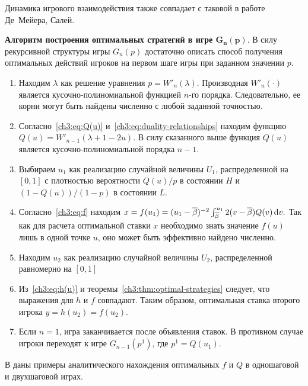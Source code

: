 Динамика игрового взаимодействия также совпадает с таковой в работе Де~Мейера, Салей.

\noindent
\textbf{Алгоритм построения оптимальных стратегий в игре $\mathbf{G_n(p)}$}.
В силу рекурсивной структуры игры $G_n(p)$ достаточно описать способ получения оптимальных действий игроков на первом шаге игры при заданном значении $p$.
\begin{enumerate}
\item
  Находим $\lambda$ как решение уравнения 
  $
    p = W'_n(\lambda).
  $
  Производная $W'_n(\cdot)$ является кусочно-полиномиальной функцией $n$-го порядка.
  Следовательно, ее корни могут быть найдены численно с любой заданной точностью.
\item
  Согласно~\eqref{ch3:eq:Q(u)} и~\eqref{ch3:eq:duality-relationships} находим функцию 
  $
    Q(u) = W'_{n-1}(\lambda + 1 - 2u).
  $
  В силу сказанного выше функция $Q(u)$ является кусочно-полиномиальной порядка $n-1$.
\item
  Выбираем $u_1$ как реализацию случайной величины $U_1$, распределенной на $[0, 1]$ с плотностью вероятности $Q(u)/p$ в состоянии $H$ и $\left(1 - Q(u)\right)/(1-p)$ в состоянии $L$.
\item
  Согласно~\eqref{ch3:eq:f} находим 
  $
    x = f(u_1) = (u_1 - {{\overline{\beta}}})^{-2} \int_{{{\overline{\beta}}}}^{u_1} 2 (v - {{\overline{\beta}}}) Q(v) \mathop{}\!\mathrm{d} v.
  $
  Так как для расчета оптимальной ставки $x$ необходимо знать значение $f(u)$ лишь в одной точке $u$, оно может быть эффективно найдено численно.
\item
  Находим $u_2$ как реализацию случайной величины $U_2$, распределенной равномерно на $[0, 1]$
\item
  Из~\eqref{ch3:eq:h(u)} и теоремы~\ref{ch3:thm:optimal-strategies} следует, что выражения для $h$ и $f$ совпадают.
  Таким образом, оптимальная ставка второго игрока $y = h(u_2) = f(u_2)$.
\item
  Если $n = 1$, игра заканчивается после объявления ставок. В противном случае игроки переходят к игре $G_{n-1}(p^1)$, где $p^1 = Q(u_1)$.
\end{enumerate}

В  даны примеры аналитического нахождения оптимальных $f$ и $Q$ в одношаговой и двухшаговой играх.

% 


